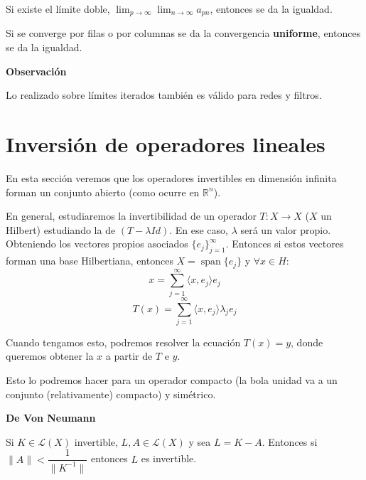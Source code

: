\documentclass[openany]{book}
\begin{document}
\begin{proposition}
    Si existe el límite doble, $ \lim_{p \to \infty}\lim_{n \to \infty} a_{pn}$, entonces se da la igualdad.
\end{proposition}

\begin{theorem}
    Si se converge por filas o por columnas se da la convergencia \textbf{uniforme}, entonces se da la igualdad.
\end{theorem}


\begin{flushright}
    \textbf{Observación}
\end{flushright}

Lo realizado sobre límites iterados también es válido para redes y filtros.



\section{Inversión de operadores lineales}

En esta sección veremos que los operadores invertibles en dimensión infinita forman un conjunto abierto (como ocurre en $ \mathbb{R}^{n}$). 

En general, estudiaremos la invertibilidad de un operador $ T: X \to X$ ($ X$ un Hilbert) estudiando la de $ (T- \lambda  Id)$. En ese caso, $ \lambda $ será un valor propio. Obteniendo los vectores propios asociados $ \{e_j\}_{j=1}^{\infty}$. Entonces si estos vectores forman una base Hilbertiana, entonces $ X = \operatorname{span} \{e_j\}$ y $ \forall x \in H$:
$$ x = \sum\limits_{j=1}^{\infty} \langle x, e_j \rangle e_j  $$
$$ T(x) = \sum\limits_{j=1}^{ \infty} \langle x, e_j \rangle \lambda_j e_j $$

Cuando tengamos esto, podremos resolver la ecuación $ T(x) = y$, donde queremos obtener la $ x$ a partir de $ T $ e $ y$.

Esto lo podremos hacer para un operador compacto (la bola unidad va a un conjunto (relativamente) compacto) y simétrico.

\begin{theorem}
    \textbf{De Von Neumann} \label{T Von Neumann}

    Si $ K \in \mathcal{L}(X)$ invertible, $ L,A \in \mathcal{L}(X)$ y sea $ L = K - A$. Entonces si $ \|A\| < \dfrac{1}{\|K ^{-1}\|}$ entonces $ L$ es invertible.
\end{theorem}
\end{document}
